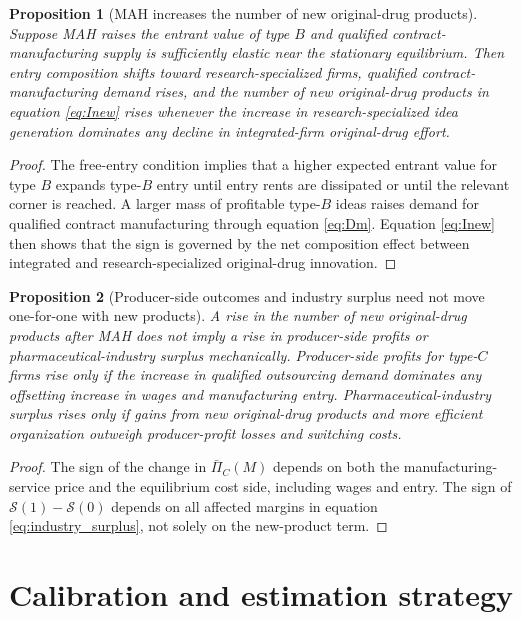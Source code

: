 \documentclass[12pt]{article}
\newtheorem{proposition}{Proposition}
\newcommand{\1}{\mathbf{1}}
\newcommand{\Surp}{\mathcal{S}}
\begin{document}
\begin{proposition}[MAH increases the number of new original-drug products]
Suppose MAH raises the entrant value of type $B$ and qualified contract-manufacturing supply is sufficiently elastic near the stationary equilibrium. Then entry composition shifts toward research-specialized firms, qualified contract-manufacturing demand rises, and the number of new original-drug products in equation \eqref{eq:Inew} rises whenever the increase in research-specialized idea generation dominates any decline in integrated-firm original-drug effort.
\end{proposition}

\begin{proof}
The free-entry condition implies that a higher expected entrant value for type $B$ expands type-$B$ entry until entry rents are dissipated or until the relevant corner is reached. A larger mass of profitable type-$B$ ideas raises demand for qualified contract manufacturing through equation \eqref{eq:Dm}. Equation \eqref{eq:Inew} then shows that the sign is governed by the net composition effect between integrated and research-specialized original-drug innovation.
\end{proof}

\begin{proposition}[Producer-side outcomes and industry surplus need not move one-for-one with new products]
A rise in the number of new original-drug products after MAH does not imply a rise in producer-side profits or pharmaceutical-industry surplus mechanically. Producer-side profits for type-$C$ firms rise only if the increase in qualified outsourcing demand dominates any offsetting increase in wages and manufacturing entry. Pharmaceutical-industry surplus rises only if gains from new original-drug products and more efficient organization outweigh producer-profit losses and switching costs.
\end{proposition}

\begin{proof}
The sign of the change in $\bar\Pi_C(M)$ depends on both the manufacturing-service price and the equilibrium cost side, including wages and entry. The sign of $\Surp(1)-\Surp(0)$ depends on all affected margins in equation \eqref{eq:industry_surplus}, not solely on the new-product term.
\end{proof}

\section{Calibration and estimation strategy}
\end{document}
